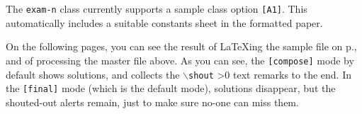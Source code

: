 \documentclass[10pt]{scrartcl}
\makeatletter
\def\csarg#1{\texttt\{\textit{#1}\texttt\}%
  \advance\@tempcnta-1
  \ifnum\@tempcnta>0
    \let\next\csarg
  \else
    \let\next\endgroup          %
  \fi
  \next}
\newcommand\cs[2][0]{\begingroup
  \color{cscolour}%
  $\backslash$\texttt{#2}%
  \@tempcnta=#1
  \ifnum\@tempcnta>0
    \let\next\csarg
  \else
    \let\next\endgroup
  \fi
  \next}
\def\opt#1{\texttt{[#1]}}
\makeatother
\begin{document}
The \texttt{exam-n} class currently supports a sample class option \opt{A1}.
This automatically includes a suitable constants sheet in the
formatted paper.

On the following pages, you can see the result of \LaTeX ing the sample file on
p.\pageref{s:template}, and of processing the master file above.
As you can see, the \opt{compose} mode by default shows solutions,
and collects the \cs[1]{shout}{text} remarks to the end.
In the \opt{final} mode (which is the default mode), solutions
disappear, but the shouted-out alerts remain, just to make sure no-one
can miss them.


\end{document}
